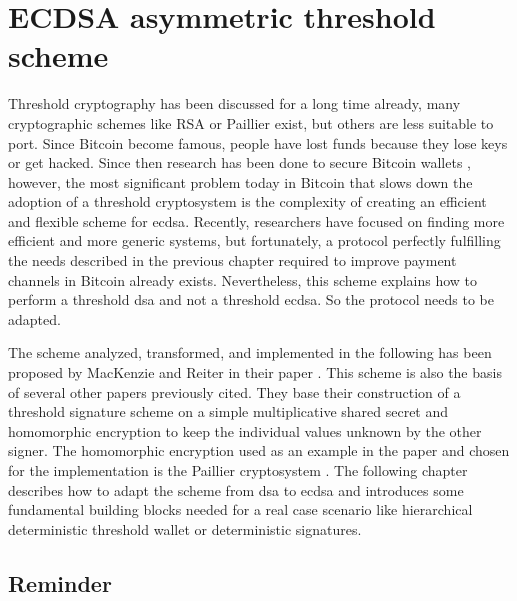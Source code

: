 \chapter{ECDSA asymmetric threshold scheme}
\label{chap:threshold}

Threshold cryptography has been discussed for a long time already, many
cryptographic schemes like RSA or Paillier \cite{10.1007/BFb0052253,
10.1007/978-3-642-27954-6_20} exist, but others are less suitable to port.
Since Bitcoin become famous, people have lost funds because they
lose keys or get hacked. Since then research has been done to secure Bitcoin
wallets \cite{Goldfeder2015SecuringBW, DBLP:conf/acns/GennaroGN16}, however, the
most significant problem today in Bitcoin that slows down the adoption of a
threshold cryptosystem is the complexity of creating an efficient and flexible
scheme for \gls{ecdsa}. Recently, researchers have focused on finding more efficient
and more generic systems, but fortunately, a protocol perfectly fulfilling the
needs described in the previous chapter required to improve payment channels in
Bitcoin already exists. Nevertheless, this scheme explains how to perform a threshold
\gls{dsa} and not a threshold \gls{ecdsa}. So the protocol needs to be
adapted.

The scheme analyzed, transformed, and implemented in the following has been
proposed by MacKenzie and Reiter in their paper  \cite{crypto-2001-1592}. This scheme is also the basis of several
other papers previously cited. They base their construction of a threshold signature
scheme on a simple multiplicative shared secret and
homomorphic encryption to keep the individual values unknown by the other
signer. The homomorphic encryption used as an example in the paper and chosen for
the implementation is the Paillier cryptosystem
\cite{Paillier:1999:PCB:1756123.1756146}. The following chapter describes how to
adapt the scheme from \gls{dsa} to \gls{ecdsa} and introduces some fundamental
building blocks needed for a real case scenario like hierarchical deterministic
threshold wallet or deterministic signatures.

\minitoc

\newpage

\section{Reminder}

